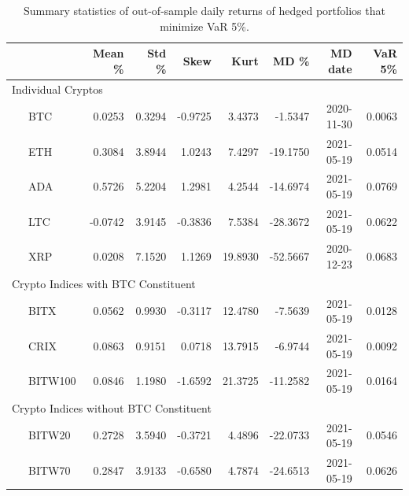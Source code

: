 \documentclass[11pt,a4paper,english]{article}
\begin{document}
{\begin{table}[h]
\end{table}\begin{table}[!] \centering %
  {%
\begin{tabular}{lrrrrrrr} \toprule
         {} &    Mean \% &     Std \% &      Skew &       Kurt &         MD \% &     MD date & VaR 5\% \\
\midrule
     \multicolumn{7}{l}{Individual Cryptos}                                                                                 \\
\ \ \ BTC     &  0.0253 &  0.3294 & -0.9725 &   3.4373 &  -1.5347 &  2020-11-30 &  0.0063 \\
\ \ \ ETH     &  0.3084 &  3.8944 &  1.0243 &   7.4297 & -19.1750 &  2021-05-19 &  0.0514 \\
\ \ \ ADA     &  0.5726 &  5.2204 &  1.2981 &   4.2544 & -14.6974 &  2021-05-19 &  0.0769 \\
\ \ \ LTC     & -0.0742 &  3.9145 & -0.3836 &   7.5384 & -28.3672 &  2021-05-19 &  0.0622 \\
\ \ \ XRP     &  0.0208 &  7.1520 &  1.1269 &  19.8930 & -52.5667 &  2020-12-23 &  0.0683 \\
   \multicolumn{7}{l}{Crypto Indices with BTC Constituent}                                                                  \\
\ \ \ BITX    &  0.0562 &  0.9930 & -0.3117 &  12.4780 &  -7.5639 &  2021-05-19 &  0.0128 \\
\ \ \ CRIX    &  0.0863 &  0.9151 &  0.0718 &  13.7915 &  -6.9744 &  2021-05-19 &  0.0092 \\
\ \ \ BITW100 &  0.0846 &  1.1980 & -1.6592 &  21.3725 & -11.2582 &  2021-05-19 &  0.0164 \\
    \multicolumn{7}{l}{Crypto Indices without BTC Constituent}                                                              \\
\ \ \ BITW20  &  0.2728 &  3.5940 & -0.3721 &   4.4896 & -22.0733 &  2021-05-19 &  0.0546 \\
\ \ \ BITW70  &  0.2847 &  3.9133 & -0.6580 &   4.7874 & -24.6513 &  2021-05-19 &  0.0626 \\
\bottomrule
\end{tabular}}
\caption{Summary statistics of out-of-sample daily returns of hedged portfolios that minimize VaR 5\%.}
\label{tab:VaR5_rh}


\end{table}}
\end{document}
